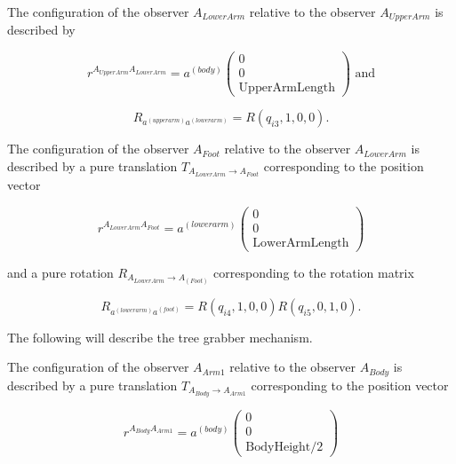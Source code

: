\documentclass{article}
\begin{document}
The configuration of the observer $A_{LowerArm}$ relative to the observer $A_{UpperArm}$ is described by

\begin{equation*}
r^{A_{UpperArm}A_{LowerArm}} = a^{(body)}\left(\begin{array}{c}
0 \\ 0 \\ \text{UpperArmLength} \end{array}\right)\text{ and}
\end{equation*}

\begin{equation*}
R_{a^{(upperarm)}a^{(lowerarm)}} = R(q_{i3},1,0,0)\text{.}
\end{equation*}%

The configuration of the observer $A_{Foot}$ relative to the observer $A_{LowerArm}$ is described by a pure translation $T_{A_{LowerArm} \rightarrow A_{Foot}}$ corresponding to the position vector

\begin{equation*}
r^{A_{LowerArm}A_{Foot}}=a^{(lowerarm)}\left(\begin{array}{c}
0 \\ 0 \\ \text{LowerArmLength} \end{array}\right)
\end{equation*}

and a pure rotation $R_{A_{LowerArm} \rightarrow A_(Foot)}$ corresponding to the rotation matrix

\begin{equation*}
R_{a^{(lowerarm)}a^{(foot)}}=R(q_{i4},1,0,0)R(q_{i5},0,1,0) \text{.}
\end{equation*}%

The following will describe the tree grabber mechanism.

The configuration of the observer $A_{Arm1}$ relative to the observer $A_{Body}$ is described by a pure translation $T_{A_{Body} \rightarrow A_{Arm1}}$ corresponding to the position vector

\begin{equation*}
r^{A_{Body}A_{Arm1}}=a^{(body)}\left(\begin{array}{c}
0 \\ 0 \\ \text{BodyHeight}/2 \end{array}\right)
\end{equation*}
\end{document}
